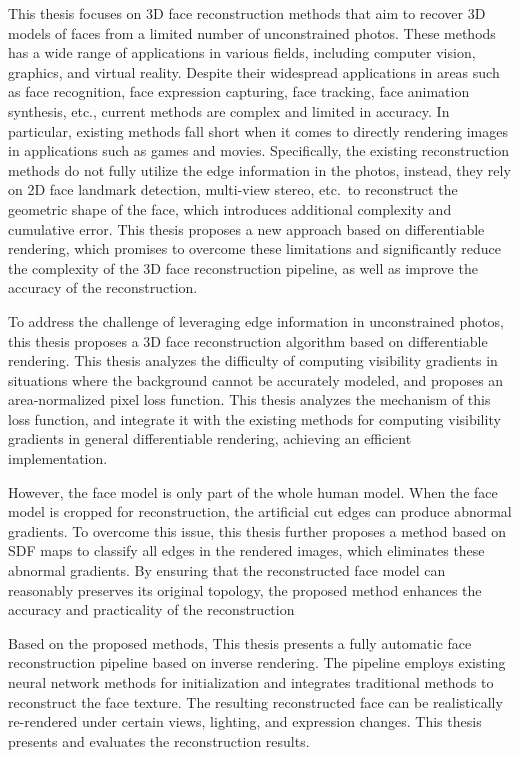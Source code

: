 \documentclass{scutmaster}
\begin{document}
This thesis focuses on 3D face reconstruction methods that aim to recover 3D models of faces from a limited number of unconstrained photos.
These methods has a wide range of applications in various fields, including computer vision, graphics, and virtual reality.
Despite their widespread applications in areas such as face recognition, face expression capturing, face tracking, face animation synthesis, etc.,
current methods are complex and limited in accuracy.
In particular, existing methods fall short when it comes to directly rendering images in applications such as games and movies.
Specifically, the existing reconstruction methods do not fully utilize the edge information in the photos,
instead, they rely on 2D face landmark detection, multi-view stereo, etc.\ to reconstruct the geometric shape of the face,
which introduces additional complexity and cumulative error.
This thesis proposes a new approach based on differentiable rendering,
which promises to overcome these limitations and significantly reduce the complexity of the 3D face reconstruction pipeline,
as well as improve the accuracy of the reconstruction.

To address the challenge of leveraging edge information in unconstrained photos,
this thesis proposes a 3D face reconstruction algorithm based on differentiable rendering.
This thesis analyzes the difficulty  of computing visibility gradients in situations where the background cannot be accurately modeled,
and proposes an area-normalized pixel loss function.
This thesis analyzes the mechanism of this loss function,
and integrate it with the existing methods for computing visibility gradients in general differentiable rendering,
achieving an efficient implementation.

However, the face model is only part of the whole human model.
When the face model is cropped for reconstruction,
the artificial cut edges can produce abnormal gradients.
To overcome this issue, this thesis further proposes a method based on SDF maps to classify all edges in the rendered images,
which eliminates these abnormal gradients.
By ensuring that the reconstructed face model can reasonably preserves its original topology,
the proposed method enhances the accuracy and practicality of the reconstruction

Based on the proposed methods, This thesis presents a fully automatic face reconstruction pipeline based on inverse rendering.
The pipeline employs existing neural network methods for initialization and integrates traditional methods to reconstruct the face texture.
The resulting reconstructed face can be realistically re-rendered under certain views, lighting, and expression changes.
This thesis presents and evaluates the reconstruction results.
\end{document}
